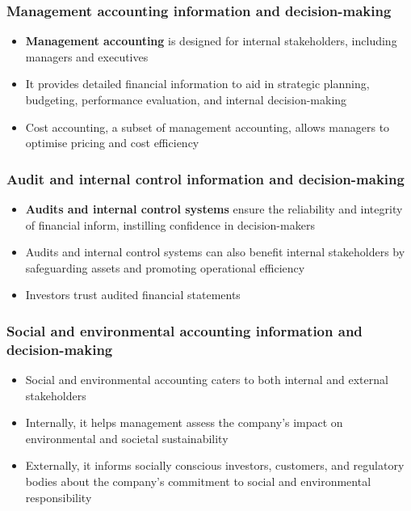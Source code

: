 \documentclass{article}
\begin{document}
		\subsubsection{Management accounting information and decision-making}
			\begin{itemize}
				\item \textbf{Management accounting} is designed for \colorbox{pastel_blue}{internal stakeholders}, including managers and executives
				\item It provides detailed financial information to aid in strategic planning, budgeting, performance evaluation, and internal decision-making
				\item Cost accounting, a subset of management accounting, allows managers to optimise pricing and cost efficiency
			\end{itemize}

		\subsubsection{Audit and internal control information and decision-making}
			\begin{itemize}
				\item \textbf{Audits and internal control systems} ensure the reliability and integrity of financial inform, instilling confidence in decision-makers
				\item Audits and internal control systems can also benefit internal stakeholders by safeguarding assets and promoting operational efficiency
				\item Investors trust audited financial statements
			\end{itemize}

		\subsubsection{Social and environmental accounting information and decision-making}
			\begin{itemize}
				\item Social and environmental accounting caters to both internal and external stakeholders
				\item Internally, it helps management assess the company's impact on environmental and societal sustainability
				\item Externally, it informs socially conscious investors, customers, and regulatory bodies about the company's commitment to social and environmental responsibility
			\end{itemize}
\end{document}

